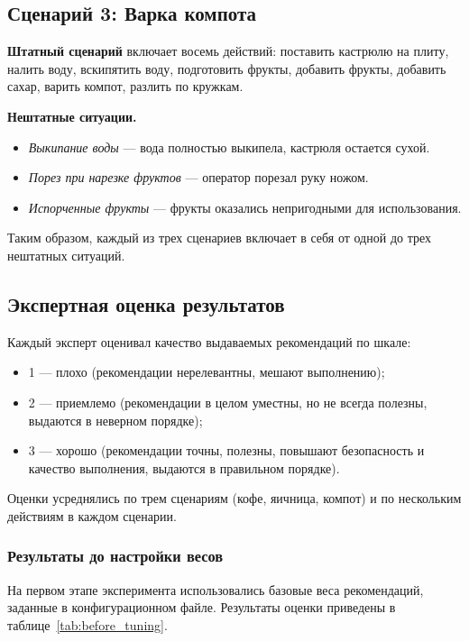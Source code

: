 \subsection*{Сценарий 3: Варка компота}

\textbf{Штатный сценарий} включает восемь действий: поставить кастрюлю на плиту, налить воду, вскипятить воду, подготовить фрукты, добавить фрукты, добавить сахар, варить компот, разлить по кружкам.

\textbf{Нештатные ситуации.}
\begin{itemize}
\item \textit{Выкипание воды} --- вода полностью выкипела, кастрюля остается сухой.
\item \textit{Порез при нарезке фруктов} --- оператор порезал руку ножом. 
\item \textit{Испорченные фрукты} --- фрукты оказались непригодными для использования. 
\end{itemize}

Таким образом, каждый из трех сценариев включает в себя от одной до трех нештатных ситуаций.

\subsection{Экспертная оценка результатов}

Каждый эксперт оценивал качество выдаваемых рекомендаций по шкале:
\begin{itemize}
\item 1 --- плохо (рекомендации нерелевантны, мешают выполнению);
\item 2 --- приемлемо (рекомендации в целом уместны, но не всегда полезны, выдаются в неверном порядке);
\item 3 --- хорошо (рекомендации точны, полезны, повышают безопасность и качество выполнения, выдаются в правильном порядке).
\end{itemize}

Оценки усреднялись по трем сценариям (кофе, яичница, компот) и по нескольким действиям в каждом сценарии.

\subsubsection*{Результаты до настройки весов}

На первом этапе эксперимента использовались базовые веса рекомендаций, заданные в конфигурационном файле.
Результаты оценки приведены в таблице~\ref{tab:before_tuning}.

